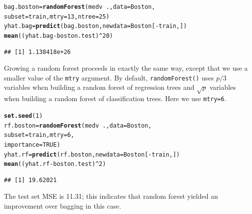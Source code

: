 \documentclass[12pt]{article}\usepackage[]{graphicx}\usepackage[]{color}
\makeatletter
\newcommand{\hlnum}[1]{\textcolor[rgb]{0.686,0.059,0.569}{#1}}%
\newcommand{\hlopt}[1]{\textcolor[rgb]{0,0,0}{#1}}%
\newcommand{\hlstd}[1]{\textcolor[rgb]{0.345,0.345,0.345}{#1}}%
\newcommand{\hlkwb}[1]{\textcolor[rgb]{0.69,0.353,0.396}{#1}}%
\newcommand{\hlkwc}[1]{\textcolor[rgb]{0.333,0.667,0.333}{#1}}%
\newcommand{\hlkwd}[1]{\textcolor[rgb]{0.737,0.353,0.396}{\textbf{#1}}}%
\newenvironment{kframe}{%
 \def\at@end@of@kframe{}%
 \ifinner\ifhmode%
  \def\at@end@of@kframe{\end{minipage}}%
  \begin{minipage}{\columnwidth}%
 \fi\fi%
 \def\FrameCommand##1{\hskip\@totalleftmargin \hskip-\fboxsep
 \colorbox{shadecolor}{##1}\hskip-\fboxsep
     \hskip-\linewidth \hskip-\@totalleftmargin \hskip\columnwidth}%
 \MakeFramed {\advance\hsize-\width
   \@totalleftmargin\z@ \linewidth\hsize
   \@setminipage}}%
 {\par\unskip\endMakeFramed%
 \at@end@of@kframe}
\newenvironment{knitrout}{}{} %
\makeatother
\begin{document}
\begin{knitrout}
\color{fgcolor}\begin{kframe}
\begin{alltt}
\hlstd{bag.boston} \hlkwb{=} \hlkwd{randomForest}\hlstd{(medv}\hlopt{~}\hlstd{.,} \hlkwc{data}\hlstd{=Boston,}
                          \hlkwc{subset}\hlstd{=train,} \hlkwc{mtry}\hlstd{=}\hlnum{13}\hlstd{,}\hlkwc{ntree}\hlstd{=}\hlnum{25}\hlstd{)}
\hlstd{yhat.bag} \hlkwb{=} \hlkwd{predict}\hlstd{(bag.boston,} \hlkwc{newdata}\hlstd{=Boston[}\hlopt{-}\hlstd{train,])}
\hlkwd{mean}\hlstd{((yhat.bag}\hlopt{-}\hlstd{boston.test)}\hlopt{^}\hlnum{20}\hlstd{)}
\end{alltt}
\begin{verbatim}
## [1] 1.138418e+26
\end{verbatim}
\end{kframe}
\end{knitrout}

Growing a random forest proceeds in exactly the same way, except that we use a smaller value of the \texttt{mtry} argument. By default, \texttt{randomForest()} uses $p/3$ variables when building a random forest of regression trees and $\sqrt{p}$ variables when building a random forest of classification trees. Here we use \texttt{mtry=6}.

\begin{knitrout}
\color{fgcolor}\begin{kframe}
\begin{alltt}
\hlkwd{set.seed}\hlstd{(}\hlnum{1}\hlstd{)}
\hlstd{rf.boston}\hlkwb{=}\hlkwd{randomForest}\hlstd{(medv}\hlopt{~}\hlstd{.,} \hlkwc{data}\hlstd{=Boston,}
                       \hlkwc{subset}\hlstd{=train,} \hlkwc{mtry}\hlstd{=}\hlnum{6}\hlstd{,}
                       \hlkwc{importance} \hlstd{=} \hlnum{TRUE}\hlstd{)}
\hlstd{yhat.rf} \hlkwb{=} \hlkwd{predict}\hlstd{(rf.boston,} \hlkwc{newdata}\hlstd{=Boston[}\hlopt{-}\hlstd{train,])}
\hlkwd{mean}\hlstd{((yhat.rf}\hlopt{-}\hlstd{boston.test)}\hlopt{^}\hlnum{2}\hlstd{)}
\end{alltt}
\begin{verbatim}
## [1] 19.62021
\end{verbatim}
\end{kframe}
\end{knitrout}

The test set MSE is 11.31; this indicates that random forest yielded an improvement over bagging in this case. 
\end{document}
